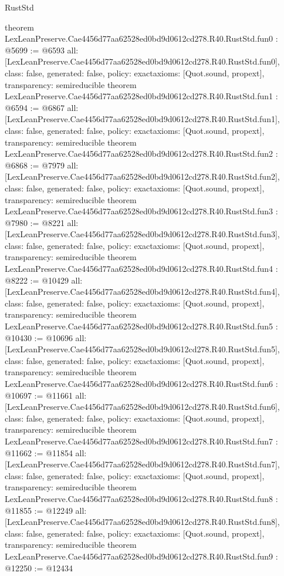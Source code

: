 \begin{lexlean}{RustStd}
\begin{coremodule}
{}
theorem LexLeanPreserve.Cae4456d77aa62528ed0bd9d0612cd278.R40.RustStd.fun0 : @5699 := @6593 {
  all: [LexLeanPreserve.Cae4456d77aa62528ed0bd9d0612cd278.R40.RustStd.fun0],
  class: false,
  generated: false,
  policy: exact{axioms: [Quot.sound, propext]},
  transparency: semireducible
}
theorem LexLeanPreserve.Cae4456d77aa62528ed0bd9d0612cd278.R40.RustStd.fun1 : @6594 := @6867 {
  all: [LexLeanPreserve.Cae4456d77aa62528ed0bd9d0612cd278.R40.RustStd.fun1],
  class: false,
  generated: false,
  policy: exact{axioms: [Quot.sound, propext]},
  transparency: semireducible
}
theorem LexLeanPreserve.Cae4456d77aa62528ed0bd9d0612cd278.R40.RustStd.fun2 : @6868 := @7979 {
  all: [LexLeanPreserve.Cae4456d77aa62528ed0bd9d0612cd278.R40.RustStd.fun2],
  class: false,
  generated: false,
  policy: exact{axioms: [Quot.sound, propext]},
  transparency: semireducible
}
theorem LexLeanPreserve.Cae4456d77aa62528ed0bd9d0612cd278.R40.RustStd.fun3 : @7980 := @8221 {
  all: [LexLeanPreserve.Cae4456d77aa62528ed0bd9d0612cd278.R40.RustStd.fun3],
  class: false,
  generated: false,
  policy: exact{axioms: [Quot.sound, propext]},
  transparency: semireducible
}
theorem LexLeanPreserve.Cae4456d77aa62528ed0bd9d0612cd278.R40.RustStd.fun4 : @8222 := @10429 {
  all: [LexLeanPreserve.Cae4456d77aa62528ed0bd9d0612cd278.R40.RustStd.fun4],
  class: false,
  generated: false,
  policy: exact{axioms: [Quot.sound, propext]},
  transparency: semireducible
}
theorem LexLeanPreserve.Cae4456d77aa62528ed0bd9d0612cd278.R40.RustStd.fun5 : @10430 := @10696 {
  all: [LexLeanPreserve.Cae4456d77aa62528ed0bd9d0612cd278.R40.RustStd.fun5],
  class: false,
  generated: false,
  policy: exact{axioms: [Quot.sound, propext]},
  transparency: semireducible
}
theorem LexLeanPreserve.Cae4456d77aa62528ed0bd9d0612cd278.R40.RustStd.fun6 : @10697 := @11661 {
  all: [LexLeanPreserve.Cae4456d77aa62528ed0bd9d0612cd278.R40.RustStd.fun6],
  class: false,
  generated: false,
  policy: exact{axioms: [Quot.sound, propext]},
  transparency: semireducible
}
theorem LexLeanPreserve.Cae4456d77aa62528ed0bd9d0612cd278.R40.RustStd.fun7 : @11662 := @11854 {
  all: [LexLeanPreserve.Cae4456d77aa62528ed0bd9d0612cd278.R40.RustStd.fun7],
  class: false,
  generated: false,
  policy: exact{axioms: [Quot.sound, propext]},
  transparency: semireducible
}
theorem LexLeanPreserve.Cae4456d77aa62528ed0bd9d0612cd278.R40.RustStd.fun8 : @11855 := @12249 {
  all: [LexLeanPreserve.Cae4456d77aa62528ed0bd9d0612cd278.R40.RustStd.fun8],
  class: false,
  generated: false,
  policy: exact{axioms: [Quot.sound, propext]},
  transparency: semireducible
}
theorem LexLeanPreserve.Cae4456d77aa62528ed0bd9d0612cd278.R40.RustStd.fun9 : @12250 := @12434 {
}
\end{coremodule}
\end{lexlean}
